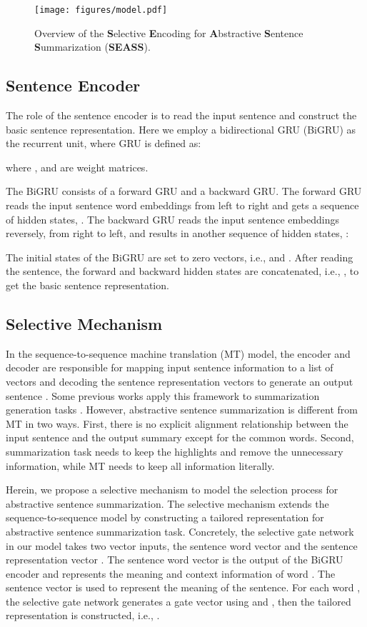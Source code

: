 \documentclass[11pt,a4paper]{article}
\begin{document}
\begin{figure*}[htb]
	\centering
	\texttt{[image: figures/model.pdf]}
	\caption{\label{fig:model} Overview of the \textbf{S}elective \textbf{E}ncoding for \textbf{A}bstractive \textbf{S}entence \textbf{S}ummarization (\textbf{SEASS}).}
\end{figure*}

\subsection{Sentence Encoder}
The role of the sentence encoder is to read the input sentence and construct the basic sentence representation.
Here we employ a bidirectional GRU (BiGRU) as the recurrent unit, where GRU is defined as:

where ,  and  are weight matrices.

The BiGRU consists of a forward GRU and a backward GRU.
The forward GRU reads the input sentence word embeddings from left to right and gets a sequence of hidden states, .
The backward GRU reads the input sentence embeddings reversely, from right to left, and results in another sequence of hidden states, :


The initial states of the BiGRU are set to zero vectors, i.e.,  and .
After reading the sentence, the forward and backward hidden states are concatenated, i.e., , to get the basic sentence representation.

\subsection{Selective Mechanism}
In the sequence-to-sequence machine translation (MT) model, the encoder and decoder are responsible for mapping input sentence information to a list of vectors and decoding the sentence representation vectors to generate an output sentence \cite{bahdanau2014neural}.
Some previous works apply this framework to summarization generation tasks \citep{nallapatiabstractive,gu-EtAl:2016:P16-1,gulcehre-EtAl:2016:P16-1}.
However, abstractive sentence summarization is different from MT in two ways.
First, there is no explicit alignment relationship between the input sentence and the output summary except for the common words.
Second, summarization task needs to keep the highlights and remove the unnecessary information, while MT needs to keep all information literally.

Herein, we propose a selective mechanism to model the selection process for abstractive sentence summarization.
The selective mechanism extends the sequence-to-sequence model by constructing a tailored representation for abstractive sentence summarization task.
Concretely, the selective gate network in our model takes two vector inputs, the sentence word vector  and the sentence representation vector .
The sentence word vector  is the output of the BiGRU encoder and represents the meaning and context information of word .
The sentence vector  is used to represent the meaning of the sentence.
For each word , the selective gate network generates a gate vector  using  and , then the tailored representation is constructed, i.e., .
\end{document}

